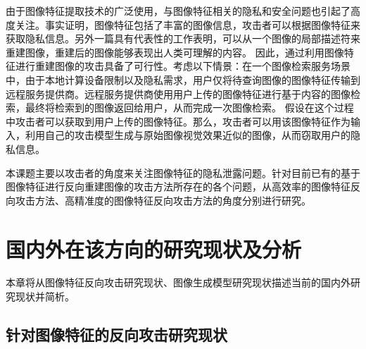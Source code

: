 \par
由于图像特征提取技术的广泛使用，与图像特征相关的隐私和安全问题也引起了高度关注\cite{9762698}\cite{Qin2014TowardsEP}。事实证明，图像特征包括了丰富的图像信息，攻击者可以根据图像特征来获取隐私信息\cite{10214250}\cite{10.1145/3386082}。另外一篇具有代表性的工作\cite{weinzaepfel2011reconstructing}表明，可以从一个图像的局部描述符来重建图像，重建后的图像能够表现出人类可理解的内容。
因此，通过利用图像特征进行重建图像的攻击具备了可行性。考虑以下情景：在一个图像检索服务场景中，由于本地计算设备限制以及隐私需求，用户仅将待查询图像的图像特征传输到远程服务提供商。远程服务提供商使用用户上传的图像特征进行基于内容的图像检索，最终将检索到的图像返回给用户，从而完成一次图像检索。
假设在这个过程中攻击者可以获取到用户上传的图像特征。那么，攻击者可以用该图像特征作为输入，利用自己的攻击模型生成与原始图像视觉效果近似的图像\cite{10.1145/3599589.3599596}\cite{SUN2020102642}，从而窃取用户的隐私信息。
\par
本课题主要以攻击者的角度来关注图像特征的隐私泄露问题。针对目前已有的基于图像特征进行反向重建图像的攻击方法所存在的各个问题，从高效率的图像特征反向攻击方法、高精准度的图像特征反向攻击方法的角度分别进行研究。
\section{国内外在该方向的研究现状及分析}
本章将从图像特征反向攻击研究现状、图像生成模型研究现状描述当前的国内外研究现状并简析。
\subsection{针对图像特征的反向攻击研究现状}

